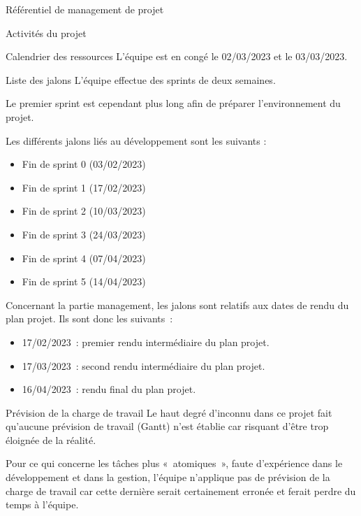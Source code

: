 \documentclass[]{article}
\begin{document}
{\begin{section}{\label{sec:Référentiel de management de projet}Référentiel de management de projet}
\begin{subsection}{\label{sec:Activités du projet}Activités du projet}
\begin{subsubsection}{\label{sec:Calendrier des ressources}Calendrier des ressources}
             L’équipe est en congé le 02/03/2023 et le 03/03/2023.
         \end{subsubsection}

         \begin{subsubsection}{\label{sec:Liste des jalons}Liste des jalons}
             L’équipe effectue des sprints de deux semaines.

             Le premier sprint est cependant plus long afin de préparer l’environnement du projet.

             Les différents jalons liés au développement sont les suivants :
             \begin{itemize}
                 \item Fin de sprint 0 (03/02/2023)
                 \item Fin de sprint 1 (17/02/2023)
                 \item Fin de sprint 2 (10/03/2023)
                 \item Fin de sprint 3 (24/03/2023)
                 \item Fin de sprint 4 (07/04/2023)
                 \item Fin de sprint 5 (14/04/2023)
             \end{itemize}

             Concernant la partie management, les jalons sont relatifs aux dates de rendu du plan projet. Ils sont donc les suivants :
             \begin{itemize}
                 \item 17/02/2023 : premier rendu intermédiaire du plan projet.
                 \item 17/03/2023 : second rendu intermédiaire du plan projet.
                 \item 16/04/2023 : rendu final du plan projet.
             \end{itemize}
         \end{subsubsection}

         \begin{subsubsection}{\label{sec:Prévision de la charge de travail}Prévision de la charge de travail}
             Le haut degré d’inconnu dans ce projet fait qu’aucune prévision de travail (Gantt) n’est établie car risquant d’être trop éloignée de la réalité.

             Pour ce qui concerne les tâches plus « atomiques », faute d’expérience dans le développement et dans la gestion, l’équipe n’applique pas de prévision de la charge de travail car cette dernière serait certainement erronée et ferait perdre du temps à l’équipe.
         \end{subsubsection}
     \end{subsection}


\end{section}}
\end{document}
